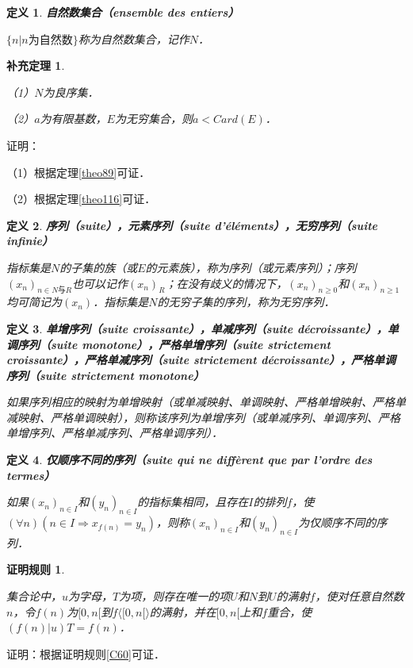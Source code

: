 \documentclass[12pt, a4paper, oneside]{book}
\newtheorem{C}{证明规则}
\newtheorem{cor}{补充定理}
\newtheorem{de}{定义}
\begin{document}
			\begin{de}
				\textbf{自然数集合（ensemble des entiers）}
				\par
				$\{n|n\text{为自然数}\}$称为自然数集合，记作$N$．
			\end{de}
			
			\begin{cor}\label{cor333}
				\hfill\par
				（1）$N$为良序集．
				\par
				（2）$a$为有限基数，$E$为无穷集合，则$a<Card(E)$．
			\end{cor}
			证明：
			\par
			（1）根据定理\ref{theo89}可证．
			\par
			（2）根据定理\ref{theo116}可证．
			
			\begin{de}
				\textbf{序列（suite），元素序列（suite d'éléments），无穷序列（suite infinie）}
				\par
				指标集是$N$的子集的族（或$E$的元素族），称为序列（或元素序列）；序列$(x_n)_{n\in N\text{与}R}$也可以记作$(x_n)_R$；在没有歧义的情况下，$(x_n)_{n\geq 0}$和$(x_n)_{n\geq 1}$均可简记为$(x_n)$．指标集是$N$的无穷子集的序列，称为无穷序列．
			\end{de}
			
			\begin{de}
				\textbf{单增序列（suite croissante），单减序列（suite décroissante），单调序列（suite monotone），严格单增序列（suite strictement croissante），严格单减序列（suite strictement décroissante），严格单调序列（suite strictement monotone）}
				\par
				如果序列相应的映射为单增映射（或单减映射、单调映射、严格单增映射、严格单减映射、严格单调映射），则称该序列为单增序列（或单减序列、单调序列、严格单增序列、严格单减序列、严格单调序列）．
			\end{de}

			\begin{de}
				\textbf{仅顺序不同的序列（suite qui ne diffèrent que par l'ordre des termes）
				}
				\par
				如果$(x_n)_{n\in I}$和$(y_n)_{n\in I}$的指标集相同，且存在$I$的排列$f$，使$(\forall n)(n\in I\Rightarrow x_{f(n)}=y_n)$，则称$(x_n)_{n\in I}$和$(y_n)_{n\in I}$为仅顺序不同的序列．
			\end{de}
			
			\begin{C}\label{C62}
				\hfill\par
				集合论中，$u$为字母，$T$为项，则存在唯一的项$U$和$N$到$U$的满射$f$，使对任意自然数$n$，令$f(n)$为$[0, n[$到$f\langle[0, n[\rangle$的满射，并在$[0, n[$上和$f$重合，使$(f(n)|u)T=f(n)$．
			\end{C}
			证明：根据证明规则\ref{C60}可证．
						
\end{document}
